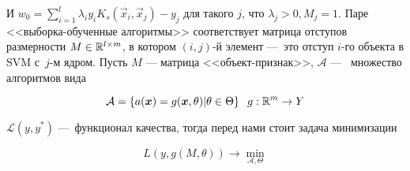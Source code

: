 \documentclass[12pt,twoside]{article}
\renewcommand{\L}{\mathcal{L}}
\begin{document}
И $w_0 = \sum_{i=1}^l \lambda_i y_i K_s(\vec{x}_i, \vec{x}_j) - y_j$ для такого $j$, что 
$\lambda_j > 0, M_j = 1$. Паре <<выборка-обученные алгоритмы>> соответствует матрица отступов размерности 
$M \in \R^{l\times m}$,
в котором $(i, j)$-й элемент ---~это отступ $i$-го объекта в SVM с~$j$-м ядром.
Пусть $M$ --- матрица <<объект-признак>>, $\mathcal{A}$ ---~ множество алгоритмов
вида

\begin{equation}
    \mathcal{A} = \left\{a(\boldsymbol{x}) = g(\boldsymbol{x}, \theta)|\theta \in \Theta\right\}\;\; g:\mathbb{R}^m \to Y
\end{equation}

$\L(y, y^*)$ ---~функционал качества, тогда перед нами стоит задача минимизации

\begin{equation}
    L(y, g(M, \theta)) \to \min_{\mathcal{A}, \Theta}
\end{equation}


\nocite{*}

\end{document}
